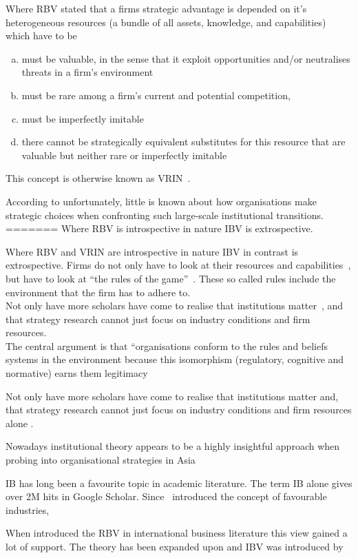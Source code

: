 Where \gls{RBV} stated that a firms strategic advantage is depended on it's heterogeneous resources (a bundle of all assets, knowledge, and capabilities) which have to be 
\begin{enumerate}[(a)]
\item must be valuable, in the sense that it exploit opportunities and/or neutralises threats in a firm’s environment
\item must be rare among a firm’s current and potential competition, 
\item must be imperfectly imitable
\item  there cannot be strategically equivalent substitutes for this resource that are valuable but neither rare or imperfectly imitable 
\end{enumerate} 
This concept is otherwise known as VRIN~\cite{Barney:1991}. 


According to \cite{Peng:2003} unfortunately, little is known about how organisations make strategic choices when confronting such large-scale institutional transitions.
=======
Where \gls{RBV}  is introspective in nature \gls{IBV} is extrospective.


Where \gls{RBV} and VRIN are introspective in nature \gls{IBV} in contrast is extrospective. Firms do not only have to look at their resources and capabilities~\cite{Barney:1991}, but have to look at ``the rules of the game''~\cite{Scott:2001}. These so called rules include the environment that the firm \nme has to adhere to.\\


Not only have   more scholars have come to realise that institutions matter~\cite{Powell:1991,Scott:2001}, and that strategy research cannot just focus on industry conditions and firm resources.\\

The central argument is that “organisations conform to the rules and beliefs systems in the environment because this isomorphism (regulatory, cognitive and normative) earns them legitimacy


Not only have more scholars have come to realise that institutions matter and, that strategy research cannot just focus on industry conditions and firm resources alone \cite{Powell:1991,Scott:2001}.

Nowadays institutional theory appears to be a highly insightful approach when probing into organisational strategies in Asia~\cite{Hoskisson:2000}



\Gls{IB} has long been a favourite topic in academic literature. The term \gls{IB} alone gives over 2M hits in Google Scholar. Since~\cite{Porter:1980} introduced the concept of favourable industries, 

When introduced the \gls{RBV} in international business literature this view gained a lot of support. 
The theory has been expanded upon and \gls{IBV} was introduced by~\cite{Kostova:1999,Meyer:2009,Wang:2012}
